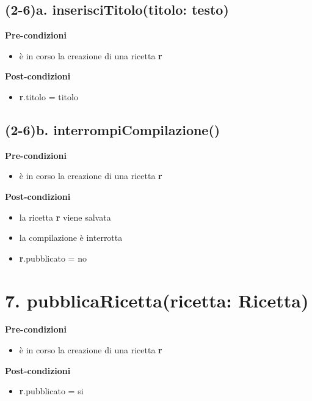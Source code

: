 \documentclass[12pt]{extarticle}
\begin{document}
\subsection*{(2-6)a. inserisciTitolo(titolo: testo)}

\textbf{Pre-condizioni}
\begin{itemize}
  \item è in corso la creazione di una ricetta  \textbf{r}
\end{itemize}
\textbf{Post-condizioni}
\begin{itemize}
  \item \textbf{r}.titolo = titolo
\end{itemize}

\subsection*{(2-6)b. interrompiCompilazione()}

\textbf{Pre-condizioni}
\begin{itemize}
  \item è in corso la creazione di una ricetta  \textbf{r}
\end{itemize}
\textbf{Post-condizioni}
\begin{itemize}
  \item la ricetta  \textbf{r} viene salvata
  \item la compilazione è interrotta
  \item \textbf{r}.pubblicato = no
\end{itemize}

\section*{7. pubblicaRicetta(ricetta: Ricetta)}

\textbf{Pre-condizioni}
\begin{itemize}
  \item è in corso la creazione di una ricetta  \textbf{r}
\end{itemize}
\textbf{Post-condizioni}
\begin{itemize}
  \item \textbf{r}.pubblicato = si
\end{itemize}
\end{document}

